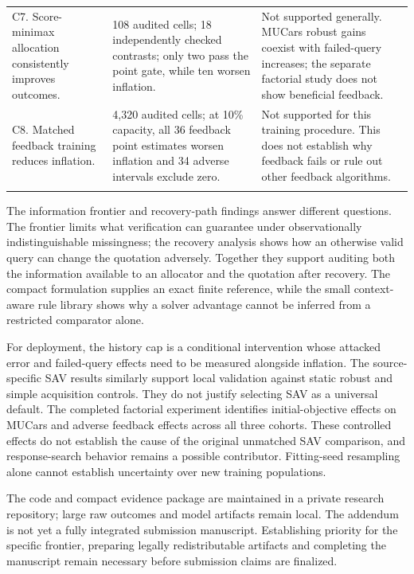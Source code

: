\documentclass[11pt]{article}
\begin{document}
\begin{longtable}{p{}p{}p{}}
\addlinespace
C7. Score-minimax allocation consistently improves outcomes. & 108 audited cells; 18 independently checked contrasts; only two pass the point gate, while ten worsen inflation. & Not supported generally. MUCars robust gains coexist with failed-query increases; the separate factorial study does not show beneficial feedback.\\
\addlinespace
C8. Matched feedback training reduces inflation. & 4,320 audited cells; at 10\% capacity, all 36 feedback point estimates worsen inflation and 34 adverse intervals exclude zero. & Not supported for this training procedure. This does not establish why feedback fails or rule out other feedback algorithms.\\
\addlinespace
\bottomrule
\end{longtable}
\normalsize

The information frontier and recovery-path findings answer different questions.
The frontier limits what verification can guarantee under observationally
indistinguishable missingness; the recovery analysis shows how an otherwise
valid query can change the quotation adversely. Together they support auditing
both the information available to an allocator and the quotation after recovery.
The compact formulation supplies an exact finite reference, while the small
context-aware rule library shows why a solver advantage cannot be inferred
from a restricted comparator alone.

For deployment, the history cap is a conditional intervention whose attacked
error and failed-query effects need to be measured alongside inflation. The
source-specific SAV results similarly support local validation against static
robust and simple acquisition controls. They do not justify selecting SAV as
a universal default. The completed factorial experiment identifies initial-objective
effects on MUCars and adverse feedback effects across all three cohorts.
These controlled effects do not establish the cause of the original unmatched
SAV comparison, and response-search behavior remains a possible contributor. Fitting-seed resampling alone cannot establish uncertainty over
new training populations.

The code and compact evidence package are maintained in a private research
repository; large raw outcomes and model artifacts remain local. The addendum
is not yet a fully integrated submission manuscript. Establishing priority for
the specific frontier, preparing legally redistributable artifacts and completing
the manuscript remain necessary before submission claims are finalized.
\end{document}
